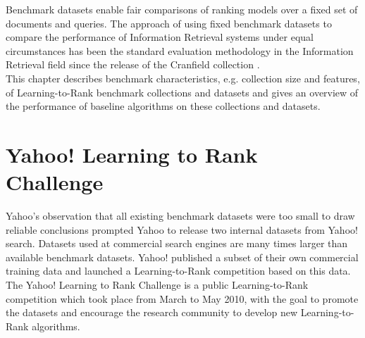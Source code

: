 \label{chap:benchmark_results}
Benchmark datasets enable fair comparisons of ranking models over a fixed set of documents and queries. The approach of using fixed benchmark datasets to compare the performance of Information Retrieval systems under equal circumstances has been the standard evaluation methodology in the Information Retrieval field since the release of the Cranfield collection \cite{Cleverdon1966}.\\

This chapter describes benchmark characteristics, e.g. collection size and features, of Learning-to-Rank benchmark collections and datasets and gives an overview of the performance of baseline algorithms on these collections and datasets.\\

\section{Yahoo! Learning to Rank Challenge}
Yahoo's observation that all existing benchmark datasets were too small to draw reliable conclusions prompted Yahoo to release two internal datasets from Yahoo! search. Datasets used at commercial search engines are many times larger than available benchmark datasets. Yahoo! published a subset of their own commercial training data and launched a Learning-to-Rank competition based on this data. The Yahoo! Learning to Rank Challenge \cite{Chapelle2011a} is a public Learning-to-Rank competition which took place from March to May 2010, with the goal to promote the datasets and encourage the research community to develop new Learning-to-Rank algorithms.\\


